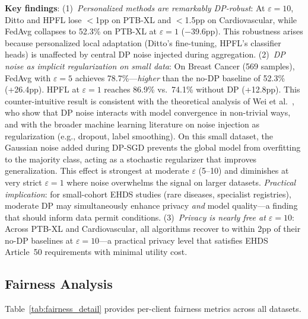 \documentclass[conference,a4paper]{IEEEtran}
\begin{document}
\textbf{Key findings}: (1)~\textit{Personalized methods are remarkably DP-robust}: At $\varepsilon{=}10$, Ditto and HPFL lose $<$1pp on PTB-XL and $<$1.5pp on Cardiovascular, while FedAvg collapses to 52.3\% on PTB-XL at $\varepsilon{=}1$ ($-$39.6pp). This robustness arises because personalized local adaptation (Ditto's fine-tuning, HPFL's classifier heads) is unaffected by central DP noise injected during aggregation.
(2)~\textit{DP noise as implicit regularization on small data}: On Breast Cancer (569 samples), FedAvg with $\varepsilon{=}5$ achieves 78.7\%---\textit{higher} than the no-DP baseline of 52.3\% (+26.4pp). HPFL at $\varepsilon{=}1$ reaches 86.9\% vs.\ 74.1\% without DP (+12.8pp). This counter-intuitive result is consistent with the theoretical analysis of Wei et al.~\cite{wei2020federated}, who show that DP noise interacts with model convergence in non-trivial ways, and with the broader machine learning literature on noise injection as regularization (e.g., dropout, label smoothing). On this small dataset, the Gaussian noise added during DP-SGD prevents the global model from overfitting to the majority class, acting as a stochastic regularizer that improves generalization. This effect is strongest at moderate $\varepsilon$ (5--10) and diminishes at very strict $\varepsilon{=}1$ where noise overwhelms the signal on larger datasets. \textit{Practical implication}: for small-cohort EHDS studies (rare diseases, specialist registries), moderate DP may simultaneously enhance privacy \textit{and} model quality---a finding that should inform data permit conditions.
(3)~\textit{Privacy is nearly free at $\varepsilon{=}10$}: Across PTB-XL and Cardiovascular, all algorithms recover to within 2pp of their no-DP baselines at $\varepsilon{=}10$---a practical privacy level that satisfies EHDS Article~50 requirements with minimal utility cost.

\subsection{Fairness Analysis}

Table~\ref{tab:fairness_detail} provides per-client fairness metrics across all datasets.
\end{document}
